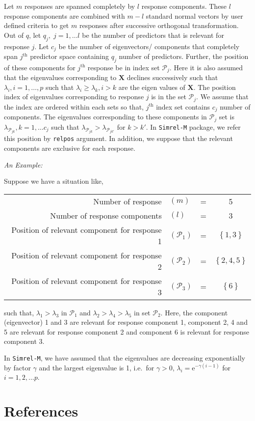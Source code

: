 \documentclass[12pt,A4paper,authoryear]{elsarticle} %
\begin{document}
Let \(m\) responses are spanned completely by \(l\) response components.
These \(l\) response components are combined with \(m-l\) standard
normal vectors by user defined criteria to get \(m\) responses after
successive orthogonal transformation. Out of \(q\), let
\(q_j,\; j = 1, \ldots l\) be the number of predictors that is relevant
for response \(j\). Let \(c_j\) be the number of eigenvectors/
components that completely span \(j^\text{th}\) predictor space
containing \(q_j\) number of predictors. Further, the position of these
components for \(j^\text{th}\) response be in index set
\(\mathcal{P}_j\). Here it is also assumed that the eigenvalues
corresponding to \(\mathbf{X}\) declines successively such that
\(\lambda_i, i = 1, \ldots, p\) such that
\(\lambda_i \ge \lambda_k, i > k\) are the eigen values of
\(\mathbf{X}\). The position index of eigenvalues corresponding to
response \(j\) is in the set \(\mathcal{P}_j\). We assume that the index
are ordered within each sets so that, \(j^\text{th}\) index set contains
\(c_j\) number of components. The eigenvalues corresponding to these
components in \(\mathcal{P}_j\) set is
\(\lambda_{\mathcal{P}_{jk}}, k = 1, \ldots c_j\) such that
\(\lambda_{\mathcal{P}_{jk}} > \lambda_{\mathcal{P}_{jk'}}\) for
\(k > k'\). In \texttt{Simrel-M} package, we refer this position by
\texttt{relpos} argument. In addition, we suppose that the relevant
components are exclusive for each response.

\emph{An Example:}

Suppose we have a situation like,

\begin{longtable}[]{@{}rlcc@{}}
\toprule
Number of response & \((m)\) & = & 5\tabularnewline
Number of response components & \((l)\) & = & 3\tabularnewline
Position of relevant component for response 1 & \((\mathcal{P}_1)\) & =
& \(\left\{ 1, 3 \right\}\)\tabularnewline
Position of relevant component for response 2 & \((\mathcal{P}_2)\) & =
& \(\left\{ 2, 4, 5 \right\}\)\tabularnewline
Position of relevant component for response 3 & \((\mathcal{P}_3)\) & =
& \(\left\{ 6 \right\}\)\tabularnewline
\bottomrule
\end{longtable}

such that, \(\lambda_1 > \lambda_3\) in \(\mathcal{P}_1\) and
\(\lambda_2 > \lambda_4 > \lambda_5\) in set \(\mathcal{P}_2\). Here,
the component (eigenvector) 1 and 3 are relevant for response component
1, component 2, 4 and 5 are relevant for response component 2 and
component 6 is relevant for response component 3.

In \texttt{Simrel-M}, we have assumed that the eigenvalues are
decreasing exponentially by factor \(\gamma\) and the largest eigenvalue
is 1, i.e.~for \(\gamma > 0\), \(\lambda_i = \text{e}^{-\gamma(i-1)}\)
for \(i = 1, 2, \ldots p\).

\section*{References}\label{references}


\renewcommand\refname{References}

\end{document}
